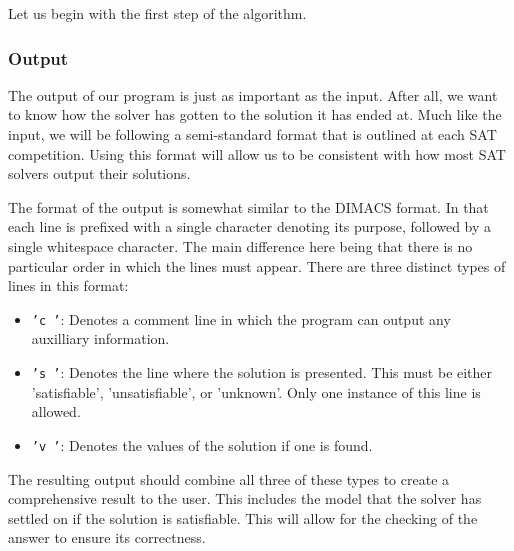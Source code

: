 \documentclass{article}
\begin{document}
Let us begin with the first step of the algorithm.


\subsubsection{Output}

The output of our program is just as important as the input. After all, we want to know how the
solver has gotten to the solution it has ended at. Much like the input, we will be following a
semi-standard format that is outlined at each SAT competition. Using this format will allow us to be
consistent with how most SAT solvers output their solutions.

The format of the output is somewhat similar to the DIMACS format. In that each line is prefixed
with a single character denoting its purpose, followed by a single whitespace character. The main
difference here being that there is no particular order in which the lines must appear. There are
three distinct types of lines in this format:

\begin{itemize}
    \item \texttt{'c '}: Denotes a comment line in which the program can output any auxilliary
    information.
    \item \texttt{'s '}: Denotes the line where the solution is presented. This must be either
    'satisfiable', 'unsatisfiable', or 'unknown'. Only one instance of this line is allowed.
    \item \texttt{'v '}: Denotes the values of the solution if one is found.
\end{itemize}

The resulting output should combine all three of these types to create a comprehensive result to the
user. This includes the model that the solver has settled on if the solution is satisfiable. This
will allow for the checking of the answer to ensure its correctness.
\end{document}
